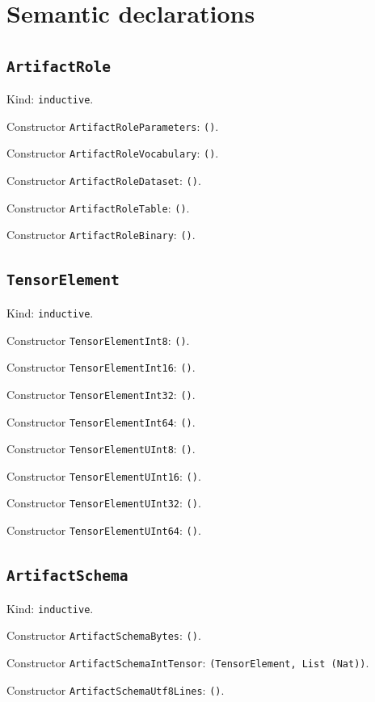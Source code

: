 \documentclass[11pt]{article}
\begin{document}
\section*{Semantic declarations}
\subsection*{\texttt{ArtifactRole}}
\noindent Kind: \texttt{inductive}.\par
\noindent Constructor \texttt{ArtifactRoleParameters}: \texttt{()}.\par
\noindent Constructor \texttt{ArtifactRoleVocabulary}: \texttt{()}.\par
\noindent Constructor \texttt{ArtifactRoleDataset}: \texttt{()}.\par
\noindent Constructor \texttt{ArtifactRoleTable}: \texttt{()}.\par
\noindent Constructor \texttt{ArtifactRoleBinary}: \texttt{()}.\par
\subsection*{\texttt{TensorElement}}
\noindent Kind: \texttt{inductive}.\par
\noindent Constructor \texttt{TensorElementInt8}: \texttt{()}.\par
\noindent Constructor \texttt{TensorElementInt16}: \texttt{()}.\par
\noindent Constructor \texttt{TensorElementInt32}: \texttt{()}.\par
\noindent Constructor \texttt{TensorElementInt64}: \texttt{()}.\par
\noindent Constructor \texttt{TensorElementUInt8}: \texttt{()}.\par
\noindent Constructor \texttt{TensorElementUInt16}: \texttt{()}.\par
\noindent Constructor \texttt{TensorElementUInt32}: \texttt{()}.\par
\noindent Constructor \texttt{TensorElementUInt64}: \texttt{()}.\par
\subsection*{\texttt{ArtifactSchema}}
\noindent Kind: \texttt{inductive}.\par
\noindent Constructor \texttt{ArtifactSchemaBytes}: \texttt{()}.\par
\noindent Constructor \texttt{ArtifactSchemaIntTensor}: \texttt{(TensorElement, List (Nat))}.\par
\noindent Constructor \texttt{ArtifactSchemaUtf8Lines}: \texttt{()}.\par
\end{document}
